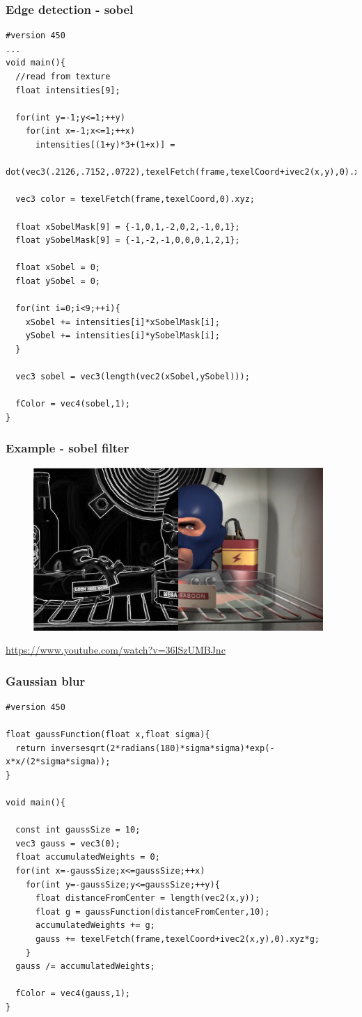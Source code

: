 \begin{frame}[fragile]
\frametitle{Edge detection - sobel}
  {\scriptsize
  \begin{verbatim}
#version 450
...
void main(){
  //read from texture
  float intensities[9];

  for(int y=-1;y<=1;++y)
    for(int x=-1;x<=1;++x)
      intensities[(1+y)*3+(1+x)] = 
        dot(vec3(.2126,.7152,.0722),texelFetch(frame,texelCoord+ivec2(x,y),0).xyz);

  vec3 color = texelFetch(frame,texelCoord,0).xyz;

  float xSobelMask[9] = {-1,0,1,-2,0,2,-1,0,1};
  float ySobelMask[9] = {-1,-2,-1,0,0,0,1,2,1};

  float xSobel = 0;
  float ySobel = 0;

  for(int i=0;i<9;++i){
    xSobel += intensities[i]*xSobelMask[i];
    ySobel += intensities[i]*ySobelMask[i];
  }

  vec3 sobel = vec3(length(vec2(xSobel,ySobel)));
  
  fColor = vec4(sobel,1);
}
  \end{verbatim}
  }
\end{frame}

\begin{frame}
\frametitle{Example - sobel filter}
  \begin{figure}[h]
  \includegraphics[width=11cm,keepaspectratio]{pics/sobel.png}
  \end{figure}
  \url{https://www.youtube.com/watch?v=36lSzUMBJnc}
\end{frame}

\begin{frame}[fragile]
\frametitle{Gaussian blur}
  {\scriptsize
  \begin{verbatim}
#version 450

float gaussFunction(float x,float sigma){
  return inversesqrt(2*radians(180)*sigma*sigma)*exp(-x*x/(2*sigma*sigma));
}

void main(){

  const int gaussSize = 10;
  vec3 gauss = vec3(0);
  float accumulatedWeights = 0;
  for(int x=-gaussSize;x<=gaussSize;++x)
    for(int y=-gaussSize;y<=gaussSize;++y){
      float distanceFromCenter = length(vec2(x,y));
      float g = gaussFunction(distanceFromCenter,10);
      accumulatedWeights += g;
      gauss += texelFetch(frame,texelCoord+ivec2(x,y),0).xyz*g;
    }
  gauss /= accumulatedWeights;

  fColor = vec4(gauss,1);
}
  \end{verbatim}
  }
\end{frame}


